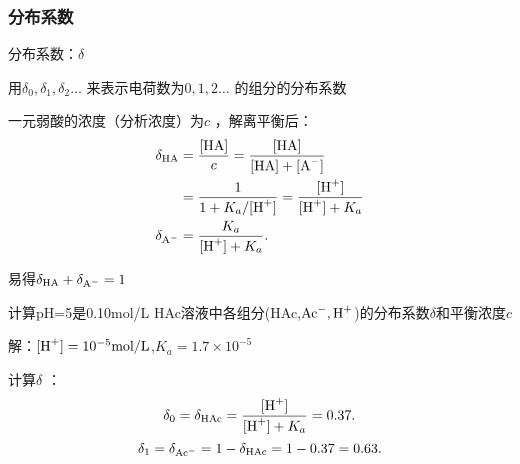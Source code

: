 \subsubsection{分布系数}%
\label{subsub:分布系数}
\begin{defi}
    分布系数：$\delta$

    用$\delta_0,\delta_1,\delta_2\ldots$ 来表示电荷数为$0,1,2\ldots$ 的组分的分布系数
\end{defi}
一元弱酸的浓度（分析浓度）为$c$ ，解离平衡后：
\begin{align*}
    \delta_{\text{HA}}&=\frac{[\text{HA}]}{c}=\frac{[\text{HA}]}{[\text{HA}]+[\ce{A-}]}\\
                      &= \frac{1}{1+K_a/[\ce{H+}]} =\frac{[\ce{H+}]}{[\ce{H+}]+K_a} \\
    \delta_{\ce{A-}}&= \frac{K_a}{\ce{[H+]}+K_a}
.\end{align*}

易得$\delta_{\text{HA}}+\delta_{\ce{A-}}=1$
\begin{eg}
    计算pH=5是0.10mol/L HAc溶液中各组分(HAc,$\ce{Ac-},\ce{H+}$)的分布系数$\delta$和平衡浓度$c$
\end{eg}
解：$\ce{[H+]}=10^{-5}\text{mol/L}$,$K_a=1.7 \times 10^{-5}$

计算$\delta$ ：\[
    \delta_0=\delta_{\text{HAc}}=\frac{[\ce{H+}]}{[\ce{H+}]+K_a}=0.37
.\] 
\[
    \delta_1=\delta_{\ce{Ac-}}=1-\delta_{\text{HAc}}=1-0.37=0.63
.\] 

